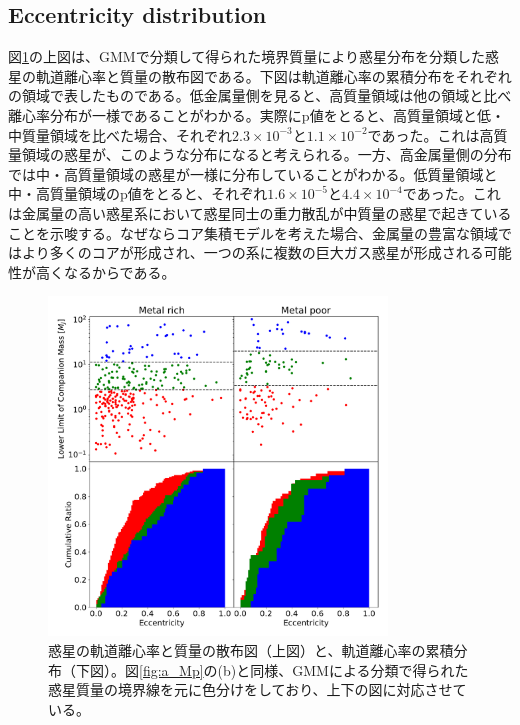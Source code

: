\documentclass[twocolumn, dvipdfmx]{aastex62}
\begin{document}
\begin{CJK*}{UTF8}{min}
\subsection{Eccentricity distribution} \label{subsec:eccentricity}

図\ref{fig:e_Mp}の上図は、GMMで分類して得られた境界質量により惑星分布を分類した惑星の軌道離心率と質量の散布図である。下図は軌道離心率の累積分布をそれぞれの領域で表したものである。低金属量側を見ると、高質量領域は他の領域と比べ離心率分布が一様であることがわかる。実際にp値をとると、高質量領域と低・中質量領域を比べた場合、それぞれ$2.3\times10^{-3}$と$1.1\times10^{-2}$であった。これは高質量領域の惑星が、このような分布になると考えられる。一方、高金属量側の分布では中・高質量領域の惑星が一様に分布していることがわかる。低質量領域と中・高質量領域のp値をとると、それぞれ$1.6\times10^{-5}$と$4.4\times10^{-4}$であった。これは金属量の高い惑星系において惑星同士の重力散乱が中質量の惑星で起きていることを示唆する。なぜならコア集積モデルを考えた場合、金属量の豊富な領域ではより多くのコアが形成され、一つの系に複数の巨大ガス惑星が形成される可能性が高くなるからである。

\begin{figure}[H]
\begin{center}
\includegraphics[width=9cm]{../../../Figure/e_Mp_merge.pdf}
\caption{惑星の軌道離心率と質量の散布図（上図）と、軌道離心率の累積分布（下図）。図\ref{fig:a_Mp}の(b)と同様、GMMによる分類で得られた惑星質量の境界線を元に色分けをしており、上下の図に対応させている。\label{fig:e_Mp}}
\end{center}
\end{figure}


\acknowledgments



\end{CJK*}
\end{document}
